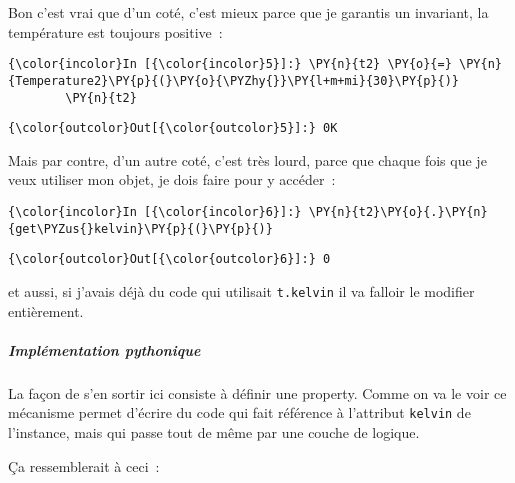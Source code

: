     Bon c'est vrai que d'un coté, c'est mieux parce que je garantis un
invariant, la température est toujours positive~:

    \begin{Verbatim}[commandchars=\\\{\},frame=single,framerule=0.3mm,rulecolor=\color{cellframecolor}]
{\color{incolor}In [{\color{incolor}5}]:} \PY{n}{t2} \PY{o}{=} \PY{n}{Temperature2}\PY{p}{(}\PY{o}{\PYZhy{}}\PY{l+m+mi}{30}\PY{p}{)}
        \PY{n}{t2}
\end{Verbatim}


\begin{Verbatim}[commandchars=\\\{\},frame=single,framerule=0.3mm,rulecolor=\color{cellframecolor}]
{\color{outcolor}Out[{\color{outcolor}5}]:} 0K
\end{Verbatim}
            
    Mais par contre, d'un autre coté, c'est très lourd, parce que chaque
fois que je veux utiliser mon objet, je dois faire pour y accéder~:

    \begin{Verbatim}[commandchars=\\\{\},frame=single,framerule=0.3mm,rulecolor=\color{cellframecolor}]
{\color{incolor}In [{\color{incolor}6}]:} \PY{n}{t2}\PY{o}{.}\PY{n}{get\PYZus{}kelvin}\PY{p}{(}\PY{p}{)}
\end{Verbatim}


\begin{Verbatim}[commandchars=\\\{\},frame=single,framerule=0.3mm,rulecolor=\color{cellframecolor}]
{\color{outcolor}Out[{\color{outcolor}6}]:} 0
\end{Verbatim}
            
    et aussi, si j'avais déjà du code qui utilisait \texttt{t.kelvin} il va
falloir le modifier entièrement.

    \hypertarget{impluxe9mentation-pythonique}{%
\subparagraph{Implémentation
pythonique}\label{impluxe9mentation-pythonique}}

    La façon de s'en sortir ici consiste à définir une property. Comme on va
le voir ce mécanisme permet d'écrire du code qui fait référence à
l'attribut \texttt{kelvin} de l'instance, mais qui passe tout de même
par une couche de logique.

Ça ressemblerait à ceci~:

